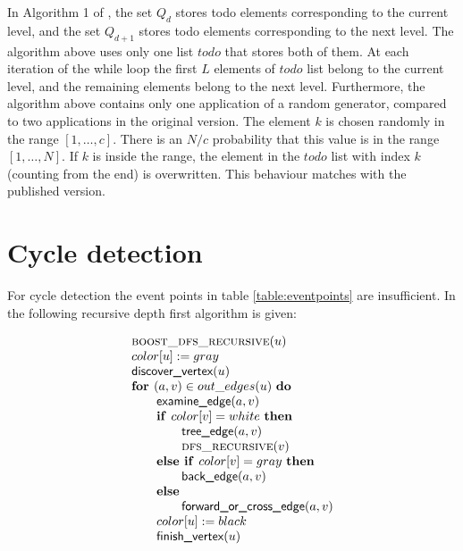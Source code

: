 \documentclass{article}
\newcommand{\Space}{\text{\ }}
\newcommand{\If}{\text{\textbf{if }}}
\newcommand{\Do}{\text{\textbf{do }}}
\newcommand{\Then}{\text{\textbf{then }}}
\newcommand{\Else}{\text{\textbf{else }}}
\newcommand{\For}{\text{\textbf{for }}}
\begin{document}
In Algorithm 1 of \cite{DBLP:journals/jlp/EngelsGWW09}, the set $Q_d$ stores todo elements corresponding to the current level, and the set $Q_{d+1}$ stores todo elements corresponding to the next level. The algorithm above uses only one list $todo$ that stores both of them. At each iteration of the while loop the first $L$ elements of $todo$ list belong to the current level, and the remaining elements belong to the next level. Furthermore, the algorithm above contains only one application of a random generator, compared to two applications in the original version. The element $k$ is chosen randomly in the range $[1, \ldots, c]$. There is an $N/c$ probability that this value is in the range $[1, \ldots, N]$. If $k$ is inside the range, the element in the $todo$ list with index $k$ (counting from the end) is overwritten. This behaviour matches with the published version.

\newpage
\section{Cycle detection}
For cycle detection the event points in table \ref{table:eventpoints} are insufficient. In \cite{2002:BGL:504206} the following recursive depth first algorithm is given:

\[
\begin{tabular}{l}
\textsc{boost\_dfs\_recursive}($u$) \\
$color[u] := gray$ \\
$\textsf{discover\_vertex}(u)$ \\
$\For (a,v) \in out\_edges(u) \Space \Do$ \\
\qquad $\textsf{examine\_edge}(a, v)$ \\
\qquad $\If color[v] = white \Space \Then$ \\
\qquad \qquad $\textsf{tree\_edge}(a, v)$ \\
\qquad \qquad \textsc{dfs\_recursive}($v$) \\
\qquad $\Else \If color[v] = gray \Space \Then$ \\
\qquad \qquad $\textsf{back\_edge}(a, v)$ \\
\qquad \Else \\
\qquad \qquad $\textsf{forward\_or\_cross\_edge}(a, v)$ \\
\qquad $color[u] := black$ \\
\qquad $\textsf{finish\_vertex}(u)$ \\
\end{tabular}
\]
\end{document}
